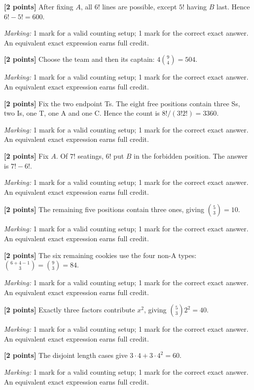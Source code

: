 \documentclass[12pt,letterpaper]{article}
\begin{document}
\begin{description}[font=\normalfont,leftmargin=1.2em,labelsep=0.4em]
\item[(a)] \textbf{[2 points]} After fixing $A$, all $6!$ lines are possible, except $5!$ having $B$ last. Hence $6!-5!=600$.
\par\textit{Marking:} 1 mark for a valid counting setup; 1 mark for the correct exact answer. An equivalent exact expression earns full credit.
\item[(b)] \textbf{[2 points]} Choose the team and then its captain: $4\binom94=504$.
\par\textit{Marking:} 1 mark for a valid counting setup; 1 mark for the correct exact answer. An equivalent exact expression earns full credit.
\item[(c)] \textbf{[2 points]} Fix the two endpoint Ts. The eight free positions contain three Ss, two Is, one T, one A and one C. Hence the count is $8!/(3!2!)=3360$.
\par\textit{Marking:} 1 mark for a valid counting setup; 1 mark for the correct exact answer. An equivalent exact expression earns full credit.
\item[(d)] \textbf{[2 points]} Fix $A$. Of $7!$ seatings, $6!$ put $B$ in the forbidden position. The answer is $7!-6!$.
\par\textit{Marking:} 1 mark for a valid counting setup; 1 mark for the correct exact answer. An equivalent exact expression earns full credit.
\item[(e)] \textbf{[2 points]} The remaining five positions contain three ones, giving $\binom53=10$.
\par\textit{Marking:} 1 mark for a valid counting setup; 1 mark for the correct exact answer. An equivalent exact expression earns full credit.
\item[(f)] \textbf{[2 points]} The six remaining cookies use the four non-A types: $\binom{6+4-1}{3}=\binom93=84$.
\par\textit{Marking:} 1 mark for a valid counting setup; 1 mark for the correct exact answer. An equivalent exact expression earns full credit.
\item[(g)] \textbf{[2 points]} Exactly three factors contribute $x^2$, giving $\binom53 2^2=40$.
\par\textit{Marking:} 1 mark for a valid counting setup; 1 mark for the correct exact answer. An equivalent exact expression earns full credit.
\item[(h)] \textbf{[2 points]} The disjoint length cases give $3\cdot4+3\cdot4^2=60$.
\par\textit{Marking:} 1 mark for a valid counting setup; 1 mark for the correct exact answer. An equivalent exact expression earns full credit.
\end{description}
\end{document}
